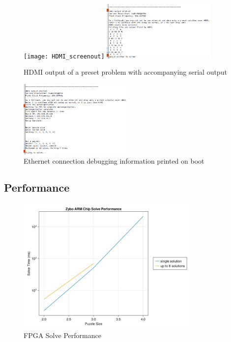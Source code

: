 \documentclass[11pt]{article}
\begin{document}
\begin{figure}[h]
  \centering
  \texttt{[image: HDMI\_screenout]}
  \includegraphics[width=0.5\textwidth]{HDMI_serialout}
  \caption{HDMI output of a preset problem with accompanying serial output}
\end{figure}

\begin{figure}[h]
  \centering
  \includegraphics[width=0.5\textwidth]{eth_serialout}
  \caption{Ethernet connection debugging information printed on boot}
\end{figure}

\subsection{Performance}\label{sec:performance}

\begin{figure}[h]
  \centering
  \includegraphics[width=0.8\textwidth]{fpga_perf}
  \caption{FPGA Solve Performance}
\end{figure}
\end{document}
